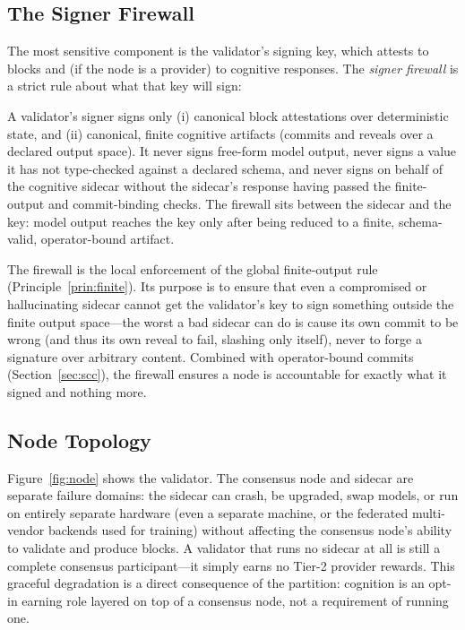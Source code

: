 \subsection{The Signer Firewall}

The most sensitive component is the validator's signing key, which attests to blocks and (if the node is a provider) to cognitive responses. The \emph{signer firewall} is a strict rule about what that key will sign:

\begin{principle}
\label{prin:firewall}
A validator's signer signs only (i) canonical block attestations over deterministic state, and (ii) canonical, finite cognitive artifacts (commits and reveals over a declared output space). It never signs free-form model output, never signs a value it has not type-checked against a declared schema, and never signs on behalf of the cognitive sidecar without the sidecar's response having passed the finite-output and commit-binding checks. The firewall sits between the sidecar and the key: model output reaches the key only after being reduced to a finite, schema-valid, operator-bound artifact.
\end{principle}

The firewall is the local enforcement of the global finite-output rule (Principle~\ref{prin:finite}). Its purpose is to ensure that even a compromised or hallucinating sidecar cannot get the validator's key to sign something outside the finite output space---the worst a bad sidecar can do is cause its own commit to be wrong (and thus its own reveal to fail, slashing only itself), never to forge a signature over arbitrary content. Combined with operator-bound commits (Section~\ref{sec:scc}), the firewall ensures a node is accountable for exactly what it signed and nothing more.

\subsection{Node Topology}

Figure~\ref{fig:node} shows the validator. The consensus node and sidecar are separate failure domains: the sidecar can crash, be upgraded, swap models, or run on entirely separate hardware (even a separate machine, or the federated multi-vendor backends used for training) without affecting the consensus node's ability to validate and produce blocks. A validator that runs no sidecar at all is still a complete consensus participant---it simply earns no Tier-2 provider rewards. This graceful degradation is a direct consequence of the partition: cognition is an opt-in earning role layered on top of a consensus node, not a requirement of running one.

